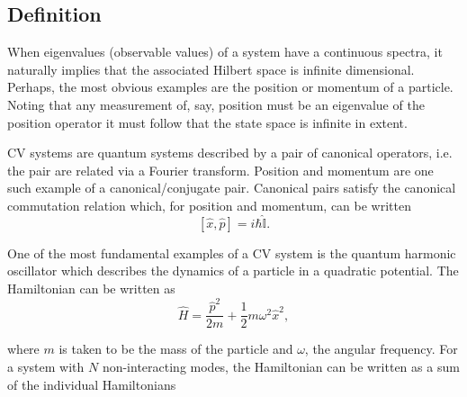 \documentclass[11pt,a4paper]{article}
\numberwithin{equation}{section}
\begin{document}
	\subsection{Definition}
	When eigenvalues (observable values) of a system have a continuous spectra, it naturally implies that the associated Hilbert space is infinite dimensional. Perhaps, the most obvious examples are the position or momentum of a particle. Noting that any measurement of, say, position must be an eigenvalue of the position operator it must follow that the state space is infinite in extent. 
	
	CV systems are quantum systems described by a pair of canonical operators, i.e. the pair are related via a Fourier transform. Position and momentum are one such example of a canonical/conjugate pair. Canonical pairs satisfy the canonical commutation relation which, for position and momentum, can be written \cite{Serafini05}
	\begin{equation} \label{eq:6}
	[\hat{x}, \hat{p}] = i\hbar\hat{\mathbb{I}}.
	\end{equation}
	
	One of the most fundamental examples of a CV system is the quantum harmonic oscillator which describes the dynamics of a particle in a quadratic potential. The Hamiltonian can be written as \cite{Adesso14, Braunstein}
	\begin{equation} \label{eq:7}
	\hat{H} = \frac{\hat{p}^2}{2m} + \frac{1}{2} m\omega^2\hat{x}^2,
	\end{equation}
	
	where $m$ is taken to be the mass of the particle and $\omega$, the angular frequency. For a system with $N$ non-interacting modes, the Hamiltonian can be written as a sum of the individual Hamiltonians 
	
\end{document}
